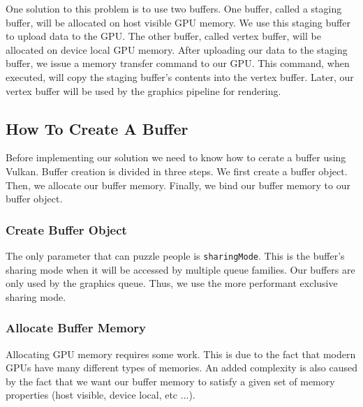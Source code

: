 One solution to this problem is to use two buffers.
One buffer, called a staging buffer, will be allocated on host visible
GPU memory.
We use this staging buffer to upload data to the GPU.
The other buffer, called vertex buffer, will be allocated on device local
GPU memory.
After uploading our data to the staging buffer, we issue a memory transfer command
to our GPU.
This command, when executed, will copy the staging buffer's contents
into the vertex buffer.
Later, our vertex buffer will be used by the graphics pipeline for rendering.

\subsection{How To Create A Buffer}

Before implementing our solution we need to know how to cerate a buffer using Vulkan.
Buffer creation is divided in three steps.
We first create a buffer object.
Then, we allocate our buffer memory.
Finally, we bind our buffer memory to our buffer object.

\subsubsection{Create Buffer Object}

The only parameter that can puzzle people is \texttt{sharingMode}.
This is the buffer's sharing mode when it will be accessed by
multiple queue families.
Our buffers are only used by the graphics queue.
Thus, we use the more performant exclusive sharing mode.

\begin{minipage}{\linewidth}{\noindent}
    
\end{minipage}

\subsubsection{Allocate Buffer Memory}

Allocating GPU memory requires some work.
This is due to the fact that modern GPUs have many different types
of memories.
An added complexity is also caused by the fact that we
want our buffer memory to satisfy a given set of memory properties
(host visible, device local, etc ...).

\begin{minipage}{\linewidth}{\noindent}
    
\end{minipage}

